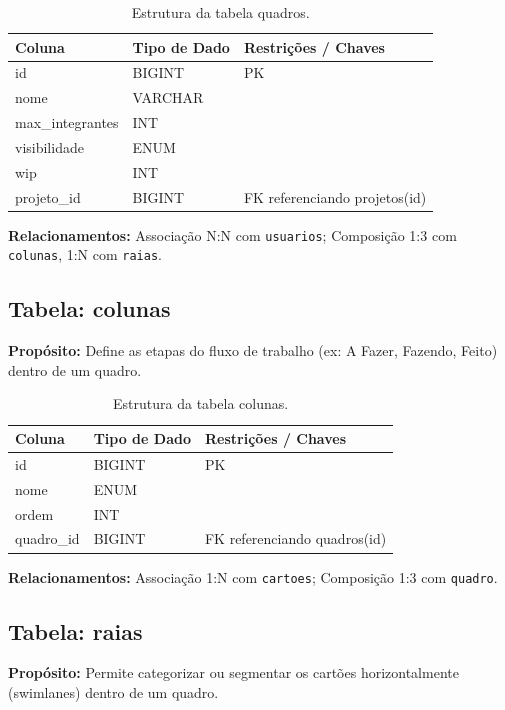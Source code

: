 \begin{table}[H]
    \centering
    \begin{tabular}{|l|l|p{8cm}|}
        \hline
        \textbf{Coluna} & \textbf{Tipo de Dado} & \textbf{Restrições / Chaves} \\
        \hline
        id & BIGINT & PK \\
        \hline
        nome & VARCHAR & \\
        \hline
        max\_integrantes & INT & \\
        \hline
        visibilidade & ENUM & \\
        \hline
        wip & INT & \\
        \hline
        projeto\_id & BIGINT & FK referenciando projetos(id) \\
        \hline
    \end{tabular}
    \caption{Estrutura da tabela quadros.}
\end{table}
\noindent \textbf{Relacionamentos:} Associação N:N com \texttt{usuarios}; Composição 1:3 com \texttt{colunas}, 1:N com \texttt{raias}.

\subsection{Tabela: colunas}
\textbf{Propósito:} Define as etapas do fluxo de trabalho (ex: A Fazer, Fazendo, Feito) dentro de um quadro.

\begin{table}[H]
    \centering
    \begin{tabular}{|l|l|p{8cm}|}
        \hline
        \textbf{Coluna} & \textbf{Tipo de Dado} & \textbf{Restrições / Chaves} \\
        \hline
        id & BIGINT & PK \\
        \hline
        nome & ENUM & \\
        \hline
        ordem & INT & \\
        \hline
        quadro\_id & BIGINT & FK referenciando quadros(id) \\
        \hline
    \end{tabular}
    \caption{Estrutura da tabela colunas.}
\end{table}
\noindent \textbf{Relacionamentos:} Associação 1:N com \texttt{cartoes}; Composição 1:3 com \texttt{quadro}.

\subsection{Tabela: raias}
\textbf{Propósito:} Permite categorizar ou segmentar os cartões horizontalmente (swimlanes) dentro de um quadro.

